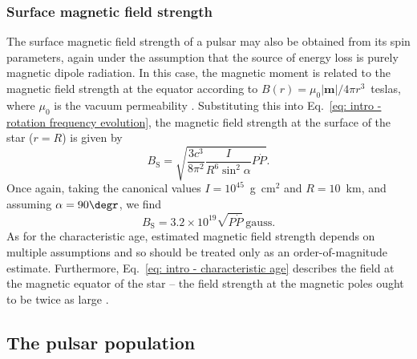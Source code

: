 \subsubsection*{Surface magnetic field strength}
\label{sec: intro - general intro - spin parameters - surface B field}

The surface magnetic field strength of a pulsar may also be obtained from its spin parameters, again under the assumption that the source of energy loss is purely magnetic dipole radiation. In this case, the magnetic moment is related to the magnetic field strength at the equator according to $B(r) = \mu_0 |\mathbf{m}|/4\pi r^3$~teslas, where $\mu_0$ is the vacuum permeability \citep[e.g.][]{Jxxx1962}. Substituting this into Eq.~\eqref{eq: intro - rotation frequency evolution}, the  magnetic field strength at the surface of the star ($r=R$) is given by
\begin{equation}
    \label{eq: intro - pulsar field strength}
    B_\mathrm{S} = \sqrt{\frac{3c^3}{8\pi^2}\frac{I}{R^6 \sin^2\alpha}P\dot{P}}.
\end{equation}
Once again, taking the canonical values $I=10^{45}$~g~cm$^2$ and $R=10$~km, and assuming $\alpha = 90\degr$, we find
\begin{equation}
    \label{eq: intro - characteristic B field}
    B_\mathrm{S} = 3.2\times 10^{19} \sqrt{P\dot{P}} \mathrm{\ gauss}.
\end{equation}
As for the characteristic age, estimated magnetic field strength depends on multiple assumptions and so should be treated only as an order-of-magnitude estimate. Furthermore, Eq.~\eqref{eq: intro - characteristic age} describes the field at the magnetic equator of the star -- the field strength at the magnetic poles ought to be twice as large \citep{STxx1983,UMxx1995}.




















\subsection{The pulsar population}
\label{sec: intro - general intro - pulsar population}

